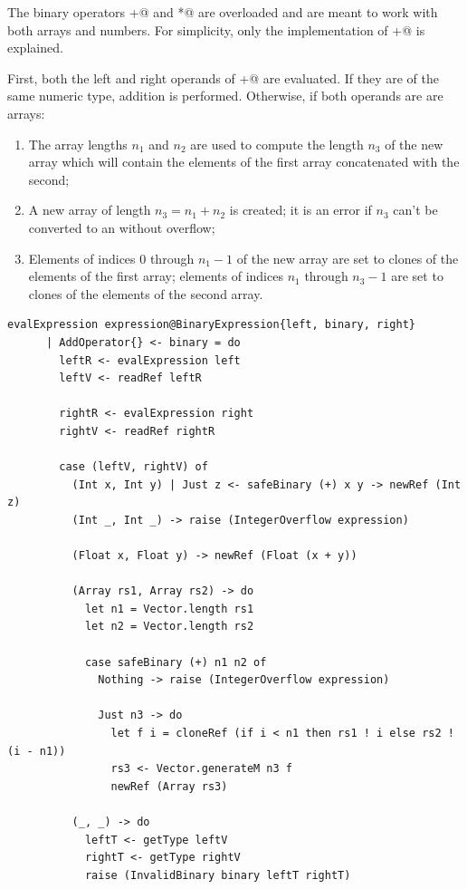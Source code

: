 \documentclass[UdineBachThesis,american,11pt]{PhdThesis}
\begin{document}
  The binary operators \lstinline@+@ and \lstinline@*@ are overloaded and are
  meant to work with both arrays and numbers. For simplicity, only the
  implementation of \lstinline@+@ is explained.

  First, both the left and right operands of \lstinline@+@ are evaluated. If
  they are of the same numeric type, addition is performed. Otherwise, if both
  operands are are arrays:

  \begin{enumerate}
    \item The array lengths $n_1$ and $n_2$ are used to compute the length $n_3$
    of the new array which will contain the elements of the first array
    concatenated with the second;

    \item A new array of length $n_3 = n_1 + n_2$ is created; it is an error if
    $n_3$ can't be converted to an \lstinline@Int@ without overflow;

    \item Elements of indices $0$ through $n_1 - 1$ of the new array are set to
    clones of the elements of the first array; elements of indices $n_1$ through
    $n_3 - 1$ are set to clones of the elements of the second array.
  \end{enumerate}

  \begin{lstlisting}[gobble=4,basicstyle=\ttfamily\small]
    evalExpression expression@BinaryExpression{left, binary, right}
      | AddOperator{} <- binary = do
        leftR <- evalExpression left
        leftV <- readRef leftR

        rightR <- evalExpression right
        rightV <- readRef rightR

        case (leftV, rightV) of
          (Int x, Int y) | Just z <- safeBinary (+) x y -> newRef (Int z)
          (Int _, Int _) -> raise (IntegerOverflow expression)

          (Float x, Float y) -> newRef (Float (x + y))

          (Array rs1, Array rs2) -> do
            let n1 = Vector.length rs1
            let n2 = Vector.length rs2

            case safeBinary (+) n1 n2 of
              Nothing -> raise (IntegerOverflow expression)

              Just n3 -> do
                let f i = cloneRef (if i < n1 then rs1 ! i else rs2 ! (i - n1))
                rs3 <- Vector.generateM n3 f
                newRef (Array rs3)

          (_, _) -> do
            leftT <- getType leftV
            rightT <- getType rightV
            raise (InvalidBinary binary leftT rightT)
  \end{lstlisting}
\end{document}
